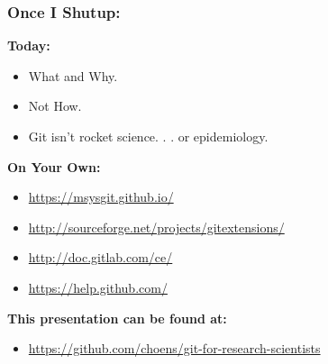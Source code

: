 \documentclass{beamer}
\begin{document}
\begin{frame} %
  \frametitle{Once I Shutup:}

  \textbf{Today:}
  \begin{itemize}
  \item What and Why.
  \item Not How.
  \item Git isn't rocket science. . . or epidemiology.
  \end{itemize}

  \bigskip
  \textbf{On Your Own:}
  \begin{itemize}
  \item {\url{https://msysgit.github.io/}}
  \item {\url{http://sourceforge.net/projects/gitextensions/}}
  \item {\url{http://doc.gitlab.com/ce/}}
  \item {\url{https://help.github.com/}}
  \end{itemize}

  \bigskip
  \textbf{This presentation can be found at:}
  \begin{itemize}
  \item {\small{\url{https://github.com/choens/git-for-research-scientists}}}
  \end{itemize}
  
\end{frame}
\end{document}
